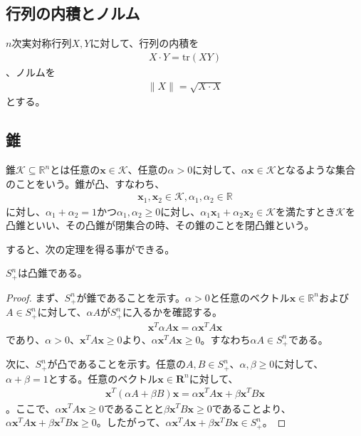 \subsection{行列の内積とノルム}
$n$次実対称行列$X, Y$に対して、行列の内積を
\begin{align*}
  X \cdot Y = \mathrm{tr}(X Y)
\end{align*}
、ノルムを
\begin{align*}
  \|X\| = \sqrt{X \cdot X}
\end{align*}
とする。

\subsection{錐}
錐$\mathcal{K} \subseteq \mathbb{R}^n$とは任意の$\mathbf{x} \in \mathcal{K}$、任意の$\alpha > 0$に対して、$\alpha \mathbf{x} \in \mathcal{K}$となるような集合のことをいう。錐が凸、すなわち、
\begin{align*}
  \mathbf{x}_1, \mathbf{x}_2 \in \mathcal{K}, \alpha_1, \alpha_2 \in \mathbb{R}
\end{align*}
に対し、$\alpha_1 + \alpha_2 = 1$かつ$\alpha_1, \alpha_2 \geq 0$に対し、$\alpha_1 \mathbf{x}_1 + \alpha_2 \mathbf{x}_2 \in \mathcal{K}$を満たすとき$\mathcal{K}$を凸錐といい、その凸錐が閉集合の時、その錐のことを閉凸錐という。

すると、次の定理を得る事ができる。
\begin{theorem*}
  $S_+^n$は凸錐である。
\end{theorem*}

\begin{proof}
  まず、$S_+^n$が錐であることを示す。$\alpha > 0$と任意のベクトル$\mathbf{x} \in \mathbb{R}^n$および$A \in S_+^n$に対して、$\alpha A$が$S_+^n$に入るかを確認する。
  \begin{align*}
    \mathbf{x}^T \alpha A \mathbf{x} = \alpha \mathbf{x}^T A \mathbf{x}
  \end{align*}
  であり、$\alpha > 0$、$\mathbf{x}^T A \mathbf{x} \geq 0$より、$\alpha \mathbf{x}^T A \mathbf{x} \geq 0$。すなわち$\alpha A \in S_+^n$である。

  次に、$S_+^n$が凸であることを示す。任意の$A, B \in S_+^n$、$\alpha, \beta \geq 0$に対して、$\alpha + \beta = 1$とする。任意のベクトル$\mathbf{x} \in \mathbf{R}^n$に対して、
  \begin{align*}
    \mathbf{x}^T (\alpha A + \beta B) \mathbf{x} = \alpha \mathbf{x}^T A \mathbf{x} + \beta \mathbf{x}^T B \mathbf{x}
  \end{align*}
  。ここで、$\alpha \mathbf{x}^T A \mathbf{x} \geq 0$であることと$\beta \mathbf{x}^T B \mathbf{x} \geq 0$であることより、$\alpha \mathbf{x}^T A \mathbf{x} + \beta \mathbf{x}^T B \mathbf{x} \geq 0$。したがって、$\alpha \mathbf{x}^T A \mathbf{x} + \beta \mathbf{x}^T B \mathbf{x} \in S_+^n$。
\end{proof}

